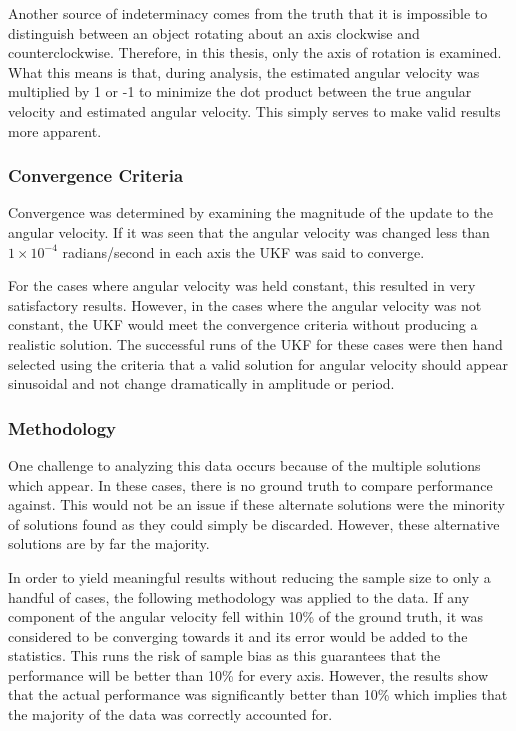 Another source of indeterminacy comes from the truth that it is impossible to distinguish between an object rotating about an axis clockwise and counterclockwise. Therefore, in this thesis, only the axis of rotation is examined. What this means is that, during analysis, the estimated angular velocity was multiplied by 1 or -1 to minimize the dot product between the true angular velocity and estimated angular velocity. This simply serves to make valid results more apparent.


\subsubsection{Convergence Criteria}
 
Convergence was determined by examining the magnitude of the update to the angular velocity. If it was seen that the angular velocity was changed less than $1\times 10^{-4}$ radians/second in each axis the UKF was said to converge.

For the cases where angular velocity was held constant, this resulted in very satisfactory results. However, in the cases where the angular velocity was not constant, the UKF would meet the convergence criteria without producing a realistic solution. The successful runs of the UKF for these cases were then hand selected using the criteria that a valid solution for angular velocity should appear sinusoidal and not change dramatically in amplitude or period.

\subsubsection{Methodology}

One challenge to analyzing this data occurs because of the multiple solutions which appear. In these cases, there is no ground truth to compare performance against. This would not be an issue if these alternate solutions were the minority of solutions found as they could simply be discarded. However, these alternative solutions are by far the majority.

In order to yield meaningful results without reducing the sample size to only a handful of cases, the following methodology was applied to the data. If any component of the angular velocity fell within 10\% of the ground truth, it was considered to be converging towards it and its error would be added to the statistics. This runs the risk of sample bias as this guarantees that the performance will be better than 10\% for every axis. However, the results show that the actual performance was significantly better than 10\% which implies that the majority of the data was correctly accounted for.

